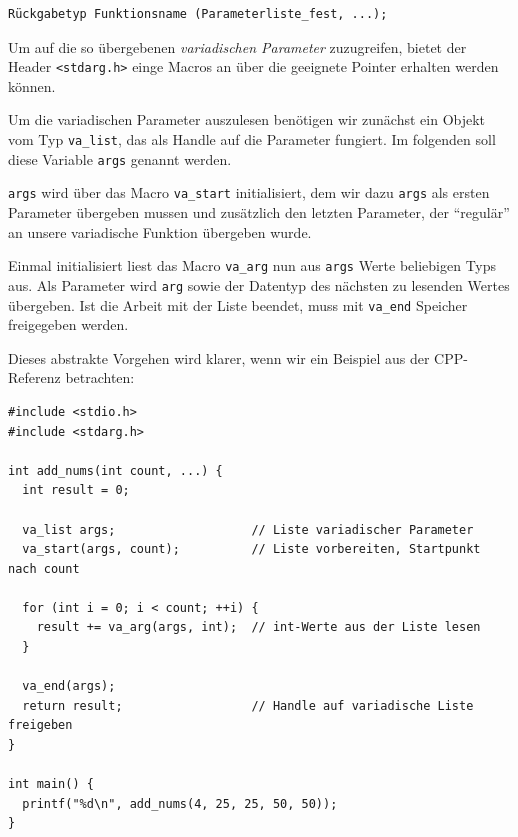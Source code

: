 \begin{codebox}
\begin{verbatim}
Rückgabetyp Funktionsname (Parameterliste_fest, ...);
\end{verbatim}
\end{codebox}

Um auf die so übergebenen \emph{variadischen Parameter} zuzugreifen, bietet der Header \texttt{<stdarg.h>} einge Macros an über die geeignete Pointer erhalten werden können.

Um die variadischen Parameter auszulesen benötigen wir zunächst ein Objekt vom Typ 
\texttt{va_list}, das als Handle auf die Parameter fungiert. Im folgenden soll diese Variable \texttt{args} genannt werden.

\texttt{args} wird über das Macro \texttt{va_start} initialisiert, dem wir dazu \texttt{args} als ersten Parameter übergeben mussen und zusätzlich den letzten Parameter, der \enquote{regulär} an unsere variadische Funktion übergeben wurde.

Einmal initialisiert liest das Macro \texttt{va_arg} nun aus \texttt{args} Werte beliebigen Typs aus. Als Parameter wird \texttt{arg} sowie der Datentyp des nächsten zu lesenden Wertes übergeben.
Ist die Arbeit mit der Liste beendet, muss mit \texttt{va_end} Speicher freigegeben werden.

Dieses abstrakte Vorgehen wird klarer, wenn wir ein Beispiel aus der CPP-Referenz betrachten:

\begin{codebox}
\begin{verbatim}
#include <stdio.h>
#include <stdarg.h>
 
int add_nums(int count, ...) {
  int result = 0;
  
  va_list args;                   // Liste variadischer Parameter
  va_start(args, count);          // Liste vorbereiten, Startpunkt nach count
  
  for (int i = 0; i < count; ++i) {
    result += va_arg(args, int);  // int-Werte aus der Liste lesen
  }
  
  va_end(args);
  return result;                  // Handle auf variadische Liste freigeben
}
 
int main() {
  printf("%d\n", add_nums(4, 25, 25, 50, 50));
}
\end{verbatim}
\end{codebox}

